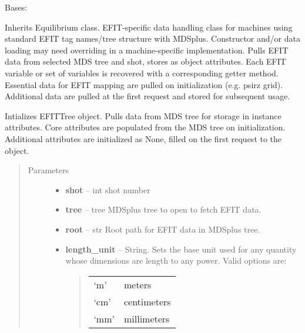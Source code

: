 \documentclass[letterpaper,10pt,english]{sphinxmanual}
\begin{document}
\begin{fulllineitems}
\label{eqtools:eqtools.EFIT.EFITTree}
Bases: {\hyperref[eqtools:eqtools.core.Equilibrium]{}}

Inherits Equilibrium class. EFIT-specific data handling class for machines using
standard EFIT tag names/tree structure with MDSplus. Constructor and/or data loading may
need overriding in a machine-specific implementation.
Pulls EFIT data from selected MDS tree and shot, stores as object attributes.
Each EFIT variable or set of variables is recovered with a corresponding getter method.
Essential data for EFIT mapping are pulled on initialization (e.g. psirz grid).
Additional data are pulled at the first request and stored for subsequent usage.

Intializes EFITTree object. Pulls data from MDS tree for storage in
instance attributes. Core attributes are populated from the MDS tree
on initialization. Additional attributes are initialized as None,
filled on the first request to the object.
\begin{quote}\begin{description}
\item[{Parameters}] \leavevmode\begin{itemize}
\item {} 
\textbf{shot} -- int
shot number

\item {} 
\textbf{tree} -- tree
MDSplus tree to open to fetch EFIT data.

\item {} 
\textbf{root} -- str
Root path for EFIT data in MDSplus tree.

\item {} 
\textbf{length\_unit} -- 
String.
Sets the base unit used for any quantity whose
dimensions are length to any power. Valid options are:
\begin{quote}

\begin{tabulary}{\linewidth}{|L|L|}
\hline

`m'
 & 
meters
\\

`cm'
 & 
centimeters
\\

`mm'
 & 
millimeters
\\


\end{tabulary}
\end{quote}
\end{itemize}
\end{description}
\end{quote}
\end{fulllineitems}
\end{document}
